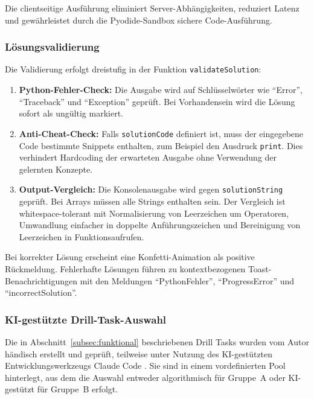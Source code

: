 Die clientseitige Ausführung eliminiert Server-Abhängigkeiten, reduziert Latenz und gewährleistet durch die Pyodide-Sandbox sichere Code-Ausführung.

\clearpage 

\subsubsection{Lösungsvalidierung}

Die Validierung erfolgt dreistufig in der Funktion \texttt{validateSolution}:
\begin{enumerate}
    \item \textbf{Python-Fehler-Check:} Die Ausgabe wird auf Schlüsselwörter wie \enquote{Error}, \enquote{Traceback} und \enquote{Exception} geprüft. Bei Vorhandensein wird die Lösung sofort als ungültig markiert.
    \item \textbf{Anti-Cheat-Check:} Falls \texttt{solutionCode} definiert ist, muss der eingegebene Code bestimmte Snippets enthalten, zum Beispiel den Ausdruck \texttt{print}. Dies verhindert Hardcoding der erwarteten Ausgabe ohne Verwendung der gelernten Konzepte.
    \item \textbf{Output-Vergleich:} Die Konsolenausgabe wird gegen \texttt{solutionString} geprüft. Bei Arrays müssen alle Strings enthalten sein. Der Vergleich ist whitespace-tolerant mit Normalisierung von Leerzeichen um Operatoren, Umwandlung einfacher in doppelte Anführungszeichen und Bereinigung von Leerzeichen in Funktionsaufrufen.
\end{enumerate}

Bei korrekter Lösung erscheint eine Konfetti-Animation als positive Rückmeldung.
Fehlerhafte Lösungen führen zu kontextbezogenen Toast-Benachrichtigungen mit den Meldungen \enquote{Python\-Fehler}, \enquote{Progress\-Error} und \enquote{incorrect\-Solution}.

\subsubsection{KI-gestützte Drill-Task-Auswahl}

Die in Abschnitt~\ref{subsec:funktional} beschriebenen Drill Tasks wurden vom Autor händisch erstellt und geprüft, teilweise unter Nutzung des KI-gestützten Entwicklungswerkzeugs Claude Code \cite{anthropic_claude}.
Sie sind in einem vordefinierten Pool hinterlegt, aus dem die Auswahl entweder algorithmisch für Gruppe~A oder KI-gestützt für Gruppe~B erfolgt.

